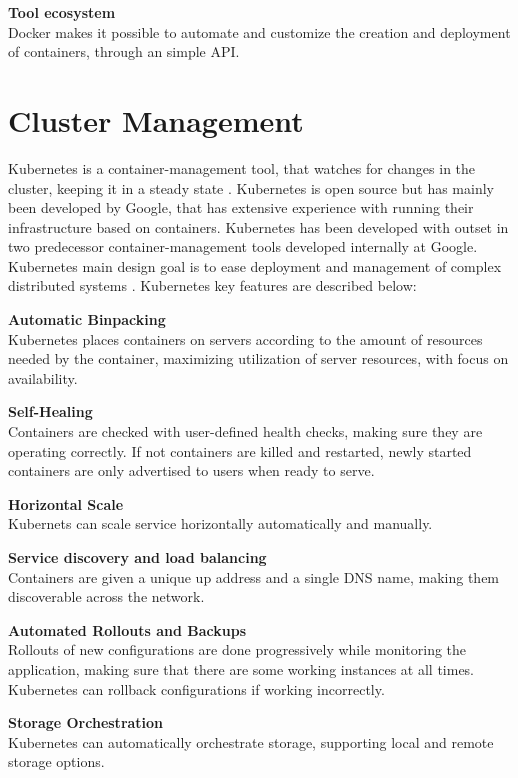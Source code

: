 \textbf{Tool ecosystem}\\
Docker makes it possible to automate and customize the creation and deployment of containers, through an simple API.

\section{Cluster Management}
\label{sec:cluster}
Kubernetes is a container-management tool, that watches for changes in the cluster, keeping it in a steady state \cite{burns2016borg}. Kubernetes is open source but has mainly been developed by Google, that has extensive experience with running their infrastructure based on containers. Kubernetes has been developed with outset in two predecessor container-management tools developed internally at Google. Kubernetes main design goal is to ease deployment and management of complex distributed systems \cite{kubernetes_frontpage}. Kubernetes key features are described below:

\textbf{Automatic Binpacking}\\
Kubernetes places containers on servers according to the amount of resources needed by the container, maximizing utilization of server resources, with focus on availability.

\textbf{Self-Healing}\\
Containers are checked with user-defined health checks, making sure they are operating correctly. If not containers are killed and restarted, newly started containers are only advertised to users when ready to serve.

\textbf{Horizontal Scale}\\
Kubernets can scale service horizontally automatically and manually.

\textbf{Service discovery and load balancing}\\
Containers are given a unique up address and a single DNS name, making them discoverable across the network.

\textbf{Automated Rollouts and Backups}\\
Rollouts of new configurations are done progressively while monitoring the application, making sure that there are some working instances at all times. Kubernetes can rollback configurations if working incorrectly.

\textbf{Storage Orchestration}\\
Kubernetes can automatically orchestrate storage, supporting local and remote storage options.

